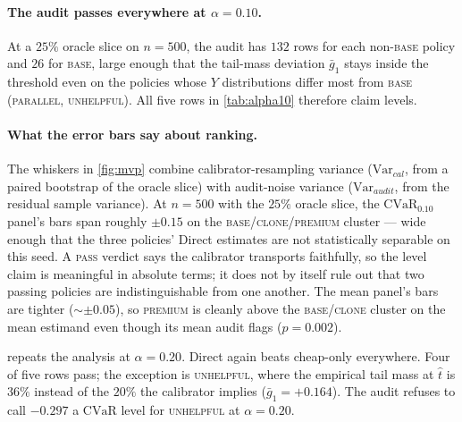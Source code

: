 \documentclass[11pt]{article}
\newcommand{\that}{\widehat{t}}
\newcommand{\CVaR}{\mathrm{CVaR}}
\begin{document}
\paragraph{The audit passes everywhere at $\alpha = 0.10$.}
At a $25\%$ oracle slice on $n = 500$, the audit has $132$ rows for
each non-\textsc{base} policy and $26$ for \textsc{base}, large enough
that the tail-mass deviation $\bar g_1$ stays inside the threshold
even on the policies whose $Y$ distributions differ most from
\textsc{base} (\textsc{parallel}, \textsc{unhelpful}). All five rows
in \cref{tab:alpha10} therefore claim levels.

\paragraph{What the error bars say about ranking.}
The whiskers in \cref{fig:mvp} combine calibrator-resampling variance
($\mathrm{Var}_{cal}$, from a paired bootstrap of the oracle slice)
with audit-noise variance ($\mathrm{Var}_{audit}$, from the residual
sample variance). At $n = 500$ with the $25\%$ oracle slice, the
$\CVaR_{0.10}$ panel's bars span roughly $\pm 0.15$ on the
\textsc{base}/\textsc{clone}/\textsc{premium} cluster — wide enough
that the three policies' Direct estimates are not statistically
separable on this seed. A \textsc{pass} verdict says the calibrator
transports faithfully, so the level claim is meaningful in absolute
terms; it does not by itself rule out that two passing policies are
indistinguishable from one another. The mean panel's bars are tighter
($\sim \pm 0.05$), so \textsc{premium} is cleanly above the
\textsc{base}/\textsc{clone} cluster on the mean estimand even though
its mean audit flags ($p = 0.002$).

 repeats the analysis at $\alpha = 0.20$. Direct
again beats cheap-only everywhere. Four of five rows pass; the
exception is \textsc{unhelpful}, where the empirical tail mass at
$\that$ is $36\%$ instead of the $20\%$ the calibrator implies
($\bar g_1 = +0.164$). The audit refuses to call $-0.297$ a $\CVaR$
level for \textsc{unhelpful} at $\alpha = 0.20$.
\end{document}
